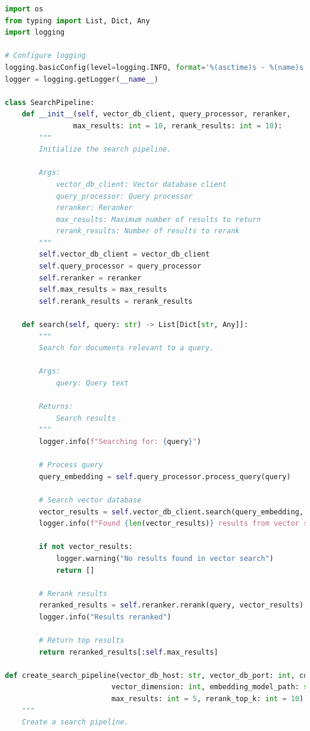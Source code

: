 \documentclass[
  screen,review,acmlarge]{acmart}
\begin{document}
\begin{lstlisting}[language=Python]
import os
from typing import List, Dict, Any
import logging

# Configure logging
logging.basicConfig(level=logging.INFO, format='%(asctime)s - %(name)s - %(levelname)s - %(message)s')
logger = logging.getLogger(__name__)

class SearchPipeline:
    def __init__(self, vector_db_client, query_processor, reranker,
                max_results: int = 10, rerank_results: int = 10):
        """
        Initialize the search pipeline.
        
        Args:
            vector_db_client: Vector database client
            query_processor: Query processor
            reranker: Reranker
            max_results: Maximum number of results to return
            rerank_results: Number of results to rerank
        """
        self.vector_db_client = vector_db_client
        self.query_processor = query_processor
        self.reranker = reranker
        self.max_results = max_results
        self.rerank_results = rerank_results
    
    def search(self, query: str) -> List[Dict[str, Any]]:
        """
        Search for documents relevant to a query.
        
        Args:
            query: Query text
            
        Returns:
            Search results
        """
        logger.info(f"Searching for: {query}")
        
        # Process query
        query_embedding = self.query_processor.process_query(query)
        
        # Search vector database
        vector_results = self.vector_db_client.search(query_embedding, limit=self.rerank_results)
        logger.info(f"Found {len(vector_results)} results from vector search")
        
        if not vector_results:
            logger.warning("No results found in vector search")
            return []
        
        # Rerank results
        reranked_results = self.reranker.rerank(query, vector_results)
        logger.info("Results reranked")
        
        # Return top results
        return reranked_results[:self.max_results]

def create_search_pipeline(vector_db_host: str, vector_db_port: int, collection_name: str, 
                         vector_dimension: int, embedding_model_path: str, reranker_model_path: str,
                         max_results: int = 5, rerank_top_k: int = 10):
    """
    Create a search pipeline.
    

\end{lstlisting}
\end{document}
